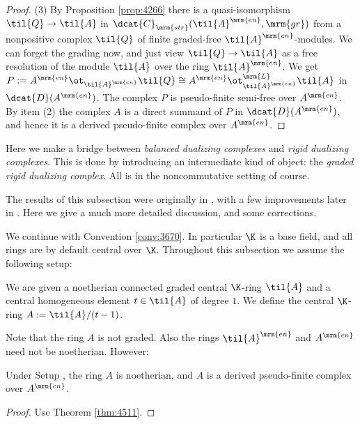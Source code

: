 \begin{proof}
\medskip \noindent 
(3) By Proposition \ref{prop:4266} there is a quasi-isomorphism 
$\til{Q} \to \til{A}$ in 
$\dcat{C}_{\mrm{str}}(\til{A}^{\mrm{en}}, \mrm{gr})$
from a nonpositive complex $\til{Q}$ of finite graded-free 
$\til{A}^{\mrm{en}}$-modules. We can forget the grading now, and just view 
$\til{Q} \to \til{A}$ as a free resolution of the module $\til{A}$ over the 
ring $\til{A}^{\mrm{en}}$. We get 
$P := A^{\mrm{en}} \ot_{\til{A}^{\mrm{en}}} \til{Q}  \cong 
A^{\mrm{en}} \ot^{\mrm{L}}_{\til{A}^{\mrm{en}}} \til{A}$ 
in $\dcat{D}(A^{\mrm{en}})$. The complex $P$ is pseudo-finite semi-free over 
$A^{\mrm{en}}$.
By item (2) the complex $A$ is a direct summand of $P$
in $\dcat{D}(A^{\mrm{en}})$, and hence it is a derived 
pseudo-finite complex over $A^{\mrm{en}}$.
\end{proof}




\label{subsec:GrR-NC-DC}

Here we make a bridge between {\em balanced dualizing complexes} and 
{\em rigid dualizing complexes}. This is done by introducing an intermediate 
kind of object: the {\em graded rigid dualizing complex}. All is in the 
noncommutative setting of course. 

The results of this subsection were originally in \cite{VdB}, with a few 
improvements later in \cite{YeZh1}. Here we give a much more detailed 
discussion, and some corrections. 

We continue with Convention \ref{conv:3670}. 
In particular $\K$ is a base field, and all rings are by default central over 
$\K$. Throughout this subsection we assume the following setup: 

\begin{setup} \label{set:4510}
We are given a noetherian connected graded central $\K$-ring $\til{A}$ and
a central homogeneous element $t \in \til{A}$ of degree $1$. 
We define the central $\K$-ring  
$A := \til{A} / (t - 1)$.
\end{setup}

Note that the ring $A$ is not graded. Also the rings
$\til{A}^{\mrm{en}}$ and $A^{\mrm{en}}$ need not be 
noetherian. However: 

\begin{prop} \label{prop:4515}
Under Setup \tup{\ref{set:4510}}, the ring $A$ is noetherian, and $A$ is a 
derived pseudo-finite complex over $A^{\mrm{en}}$.
\end{prop}

\begin{proof} 
Use Theorem \ref{thm:4511}. 
\end{proof}

